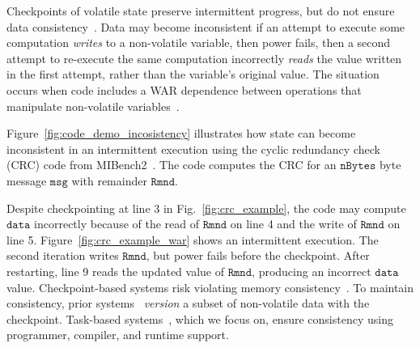 
Checkpoints of volatile state preserve intermittent progress, but do not ensure data consistency~\cite{dino,chain,ratchet}. Data may become inconsistent if an attempt to execute some computation {\em writes} to a non-volatile variable, then power fails, then a second attempt to re-execute the same computation incorrectly {\em reads} the value written in the first attempt, rather than the variable's original value. The situation occurs when code includes a WAR dependence between operations that manipulate non-volatile variables~\cite{ratchet,dino,alpaca}.

Figure~\ref{fig:code_demo_incosistency} illustrates how state can become inconsistent in an intermittent execution using the cyclic redundancy check (CRC) code from MIBench2~\cite{hicks_mibench2_2016}. The code computes the CRC for an $\texttt{nBytes}$ byte message $\texttt{msg}$ with remainder $\texttt{Rmnd}$.

Despite checkpointing at line 3 in Fig.~\ref{fig:crc_example}, the code may compute  $\texttt{data}$ incorrectly because of the read of $\texttt{Rmnd}$ on line 4 and the write of $\texttt{Rmnd}$ on line 5. Figure~\ref{fig:crc_example_war} shows an intermittent execution. The second iteration writes $\texttt{Rmnd}$, but power fails before the checkpoint. After restarting, line 9 reads the updated value of $\texttt{Rmnd}$, producing an incorrect $\texttt{data}$ value. Checkpoint-based systems risk violating memory consistency~\cite{dino}. To maintain consistency, prior systems~\cite{dino,ratchet} {\em version} a subset of non-volatile data with the checkpoint. Task-based systems~\cite{chain,alpaca}, which we focus on, ensure consistency using programmer, compiler, and runtime support.

